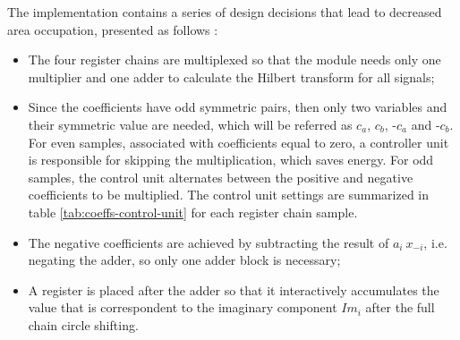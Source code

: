 The implementation contains a series of design decisions that lead to decreased area occupation, presented as follows :

\begin{itemize}
	\item The four register chains are multiplexed so that the module needs only one multiplier and one adder to calculate the Hilbert transform for all signals;
	
	\item Since the coefficients have odd symmetric pairs, then only two variables and their symmetric value are needed, which will be referred as $c_a$, $c_b$, -$c_a$ and -$c_b$. For even samples, associated with coefficients equal to zero, a controller unit is responsible for skipping the multiplication, which saves energy. For odd samples, the control unit alternates between the positive and negative coefficients to be multiplied. The control unit settings are summarized in table \ref{tab:coeffs-control-unit} for each register chain sample. 
	
	\begin{table}[!htbp] %
		\begin{center}
			\caption{Hilbert filter control unit settings for each processed sample}
			\label{tab:coeffs-control-unit}
		\end{center}
	\end{table}
	
	\item The negative coefficients are achieved by subtracting the result of $a_{i} \ x_{-i}$, i.e. negating the adder, so only one adder block is necessary;
	
	\item A register is placed after the adder so that it interactively accumulates the value that is correspondent to the imaginary component $Im_i$ after the full chain circle shifting.
	
\end{itemize}

